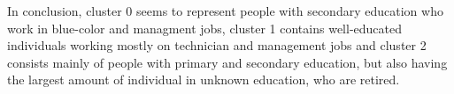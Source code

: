 \documentclass[12pt]{article}
\begin{document}
\begin{enumerate}
\begin{enumerate}[label=\alph*)]
        In conclusion, cluster 0 seems to represent people with secondary education who work in blue-color and managment jobs, 
        cluster 1 contains well-educated individuals working mostly on technician and management jobs and cluster 2 consists 
        mainly of people with primary and secondary education, but also having the largest amount of individual in unknown education, 
        who are retired.
        
    \end{enumerate}

\end{enumerate}
\end{document}
